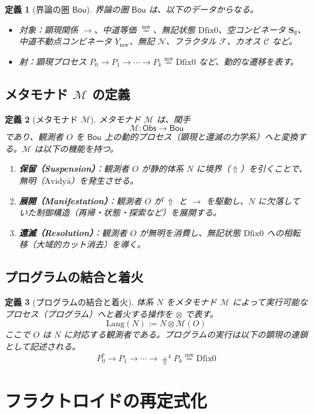 \documentclass[11pt]{article}
\newcommand{\Bou}{\textsf{Bou}}
\newcommand{\Obs}{\textsf{Obs}}
\newcommand{\M}{\mathcal{M}}
\newcommand{\Lang}{\text{Lang}}
\newcommand{\Avidya}{\text{Avidyā}}
\newcommand{\Dfix}{\text{Dfix0}}
\newcommand{\metanegation}{\Uparrow}
\newcommand{\mw}{\stackrel{\text{mw}}{=}}
\newcommand{\Svoid}{\mathbf{S}_{\emptyset}}
\newcommand{\Rmw}{Y_{\text{mw}}}
\newcommand{\N}{\mathcal{N}}
\newcommand{\F}{\mathcal{F}}
\newcommand{\C}{\mathcal{C}}
\newtheorem{definition}{定義}
\begin{document}
\begin{definition}[界論の圏 $\Bou$]
界論の圏 $\Bou$ は、以下のデータからなる。
\begin{itemize}
\item 対象：顕現関係 $\to$、中道等価 $\mw$、無記状態 $\Dfix$、空コンビネータ $\Svoid$、中道不動点コンビネータ $\Rmw$、無記 $\N$、フラクタル $\F$、カオス $\C$ など。
\item 射：顕現プロセス $P_0 \to P_1 \to \cdots \to P_k \mw \Dfix$ など、動的な遷移を表す。
\end{itemize}
\end{definition}

\subsection{メタモナド $\M$ の定義}

\begin{definition}[メタモナド $\M$]
メタモナド $\M$ は、関手
\[
\M : \Obs \to \Bou
\]
であり、観測者 $O$ を $\Bou$ 上の動的プロセス（顕現と還滅の力学系）へと変換する。$\M$ は以下の機能を持つ。
\begin{enumerate}
\item \textbf{保留（Suspension）}：観測者 $O$ が静的体系 $N$ に境界（$\metanegation$）を引くことで、無明（$\Avidya$）を発生させる。
\item \textbf{展開（Manifestation）}：観測者 $O$ が $\metanegation$ と $\to$ を駆動し、$N$ に欠落していた制御構造（再帰・状態・探索など）を展開する。
\item \textbf{還滅（Resolution）}：観測者 $O$ が無明を消費し、無記状態 $\Dfix$ への相転移（大域的カット消去）を導く。
\end{enumerate}
\end{definition}

\subsection{プログラムの結合と着火}

\begin{definition}[プログラムの結合と着火]
体系 $N$ をメタモナド $\M$ によって実行可能なプロセス（プログラム）へと着火する操作を $\otimes$ で表す。
\[
\Lang(N) := N \otimes \M(O)
\]
ここで $O$ は $N$ に対応する観測者である。プログラムの実行は以下の顕現の連鎖として記述される。
\[
P_0^* \to P_1 \to \cdots \to \metanegation^4 P_k \mw \Dfix
\]
\end{definition}

\section{フラクトロイドの再定式化}
\end{document}
